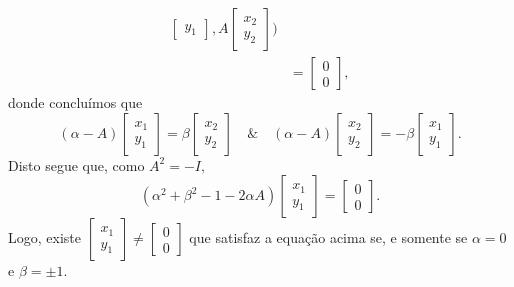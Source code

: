 \documentclass[../functional_analysis.tex]{subfiles}
\begin{document}
\begin{align*}
\begin{bmatrix}
			                                                                                                                                                                             y_1
		                                                                                                                                                                             \end{bmatrix}, A\begin{bmatrix}
			                                                                                                                                                                                             x_2 \\
			                                                                                                                                                                                             y_2
		                                                                                                                                                                                             \end{bmatrix}\biggr) \\
	                                                         & = \begin{bmatrix}
		                                                             0 \\
		                                                             0
	                                                             \end{bmatrix},
\end{align*}
donde concluímos que
\[
	(\alpha -A)\begin{bmatrix}
		x_1 \\
		y_1
	\end{bmatrix} = \beta \begin{bmatrix}
		x_2 \\
		y_2
	\end{bmatrix} \quad\&\quad (\alpha -A)\begin{bmatrix}
		x_2 \\
		y_2
	\end{bmatrix} = -\beta \begin{bmatrix}
		x_1 \\
		y_1
	\end{bmatrix}.
\]
Disto segue que, como \(A^{2} = -I,\)
\[
	(\alpha^{2}+\beta^{2}-1-2\alpha A)\begin{bmatrix}
		x_1 \\
		y_1
	\end{bmatrix} = \begin{bmatrix}
		0 \\
		0
	\end{bmatrix}.
\]
Logo, existe \(\begin{bmatrix}
	x_1 \\
	y_1
\end{bmatrix}\neq \begin{bmatrix}
	0 \\
	0
\end{bmatrix}\) que satisfaz a equação acima se, e somente se \(\alpha = 0\) e \(\beta =\pm 1\).
\end{document}
